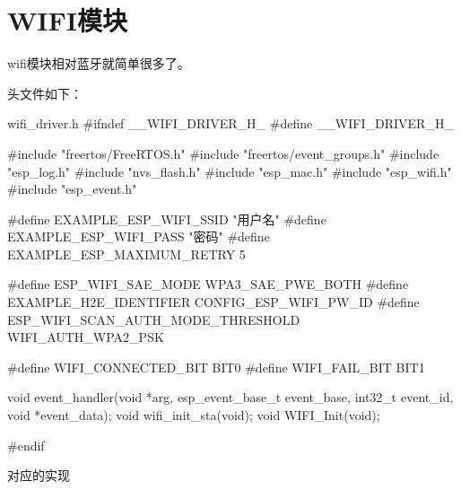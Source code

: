 \documentclass[lang=cn,newtx,10pt,scheme=chinese]{elegantbook}
\begin{document}
\chapter{WIFI模块}

wifi模块相对蓝牙就简单很多了。

头文件如下：

\begin{mycode}{wifi\_driver.h}
#ifndef __WIFI_DRIVER_H_
#define __WIFI_DRIVER_H_

#include "freertos/FreeRTOS.h"
#include "freertos/event_groups.h"
#include "esp_log.h"
#include "nvs_flash.h"
#include "esp_mac.h"
#include "esp_wifi.h"
#include "esp_event.h"

#define EXAMPLE_ESP_WIFI_SSID "用户名"
#define EXAMPLE_ESP_WIFI_PASS "密码"
#define EXAMPLE_ESP_MAXIMUM_RETRY 5

#define ESP_WIFI_SAE_MODE WPA3_SAE_PWE_BOTH
#define EXAMPLE_H2E_IDENTIFIER CONFIG_ESP_WIFI_PW_ID
#define ESP_WIFI_SCAN_AUTH_MODE_THRESHOLD WIFI_AUTH_WPA2_PSK

#define WIFI_CONNECTED_BIT BIT0
#define WIFI_FAIL_BIT BIT1

void event_handler(void *arg, esp_event_base_t event_base,
                   int32_t event_id, void *event_data);
void wifi_init_sta(void);
void WIFI_Init(void);

#endif
\end{mycode}

对应的实现
\end{document}
